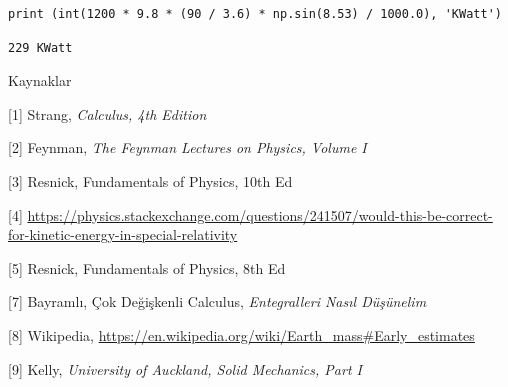 \documentclass[12pt,fleqn]{article}\usepackage{../../common}
\begin{document}
\begin{verbatim}
print (int(1200 * 9.8 * (90 / 3.6) * np.sin(8.53) / 1000.0), 'KWatt')
\end{verbatim}

\begin{verbatim}
229 KWatt
\end{verbatim}

Kaynaklar 

[1] Strang, {\em Calculus, 4th Edition}

[2] Feynman, {\em The Feynman Lectures on Physics, Volume I}

[3] Resnick, Fundamentals of Physics, 10th Ed

[4] \url{https://physics.stackexchange.com/questions/241507/would-this-be-correct-for-kinetic-energy-in-special-relativity}

[5] Resnick, Fundamentals of Physics, 8th Ed

[7] Bayramlı, Çok Değişkenli Calculus, {\em Entegralleri Nasıl Düşünelim}

[8] Wikipedia, \url{https://en.wikipedia.org/wiki/Earth_mass#Early_estimates}

[9] Kelly, {\em University of Auckland, Solid Mechanics, Part I}
\end{document}
